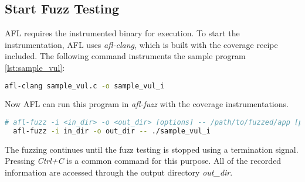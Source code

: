 \subsection{Start Fuzz Testing}

AFL requires the instrumented binary for execution. To start the instrumentation, AFL uses \textit{afl-clang}, which is built with the coverage recipe included. The following command instruments the sample program \ref{lst:sample_vul}:

\begin{lstlisting}[language=bash,style=CommandStyle,caption=Instrument $sample\_vul$.c]
    afl-clang sample_vul.c -o sample_vul_i
\end{lstlisting}

Now AFL can run this program in \textit{afl-fuzz} with the coverage instrumentations.

\begin{lstlisting}[language=bash,style=CommandStyle,caption=Execute AFL]
  # afl-fuzz -i <in_dir> -o <out_dir> [options] -- /path/to/fuzzed/app [params]
  afl-fuzz -i in_dir -o out_dir -- ./sample_vul_i
\end{lstlisting}

The fuzzing continues until the fuzz testing is stopped using a termination signal. Pressing \textit{Ctrl+C} is a common command for this purpose. All of the recorded information are accessed through the output directory \textit{out\_dir}.